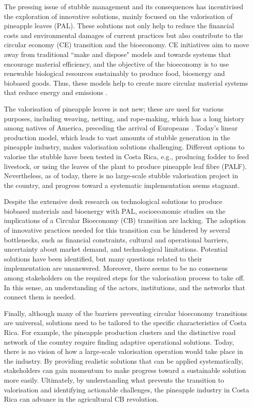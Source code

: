 The pressing issue of stubble management and its consequences has incentivised the exploration of innovative solutions, mainly focused on the valorisation of pineapple leaves (PAL). These solutions not only help to reduce the financial costs and environmental damages of current practices but also contribute to the circular economy (CE) transition and the bioeconomy. CE initiatives aim to move away from traditional ``make and dispose" models and towards systems that encourage material efficiency, and the objective of the bioeconomy is to use renewable biological resources sustainably to produce food, bioenergy and biobased goods. Thus, these models help to create more circular material systems that reduce energy and emissions \citep{IPCC_2022_WGIII_SPM}. 

The valorisation of pineapple leaves is not new; these are used for various purposes, including weaving, netting, and rope-making, which has a long history among natives of America, preceding the arrival of Europeans \citep{collins1949history, o2013pineapple}. Today's linear production model, which leads to vast amounts of stubble generation in the pineapple industry, makes valorisation solutions challenging. Different options to valorise the stubble have been tested in Costa Rica, e.g., producing fodder to feed livestock, or using the leaves of the plant to produce pineapple leaf fibre (PALF). Nevertheless, as of today, there is no large-scale stubble valorisation project in the country, and progress toward a systematic implementation seems stagnant. 

Despite the extensive desk research on technological solutions to produce biobased materials and bioenergy with PAL, socioeconomic studies on the implications of a Circular Bioeconomy (CB) transition are lacking. The adoption of innovative practices needed for this transition can be hindered by several bottlenecks, such as financial constraints, cultural and operational barriers, uncertainty about market demand, and technological limitations. Potential solutions have been identified, but many questions related to their implementation are unanswered. Moreover, there seems to be no consensus among stakeholders on the required steps for the valorisation process to take off. In this sense, an understanding of the actors, institutions, and the networks that connect them is needed. 

Finally, although many of the barriers preventing circular bioeconomy transitions are universal, solutions need to be tailored to the specific characteristics of Costa Rica. For example, the pineapple production clusters and the distinctive road network of the country require finding adaptive operational solutions. Today, there is no vision of how a large-scale valorisation operation would take place in the industry. By providing realistic solutions that can be applied systematically, stakeholders can gain momentum to make progress toward a sustainable solution more easily. Ultimately, by understanding what prevents the transition to valorisation and identifying actionable challenges, the pineapple industry in Costa Rica can advance in the agricultural CB revolution. 

